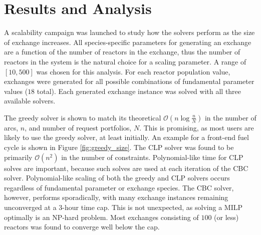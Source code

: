 \documentclass{anstrans}
\begin{document}
\section{Results and Analysis}

A scalability campaign was launched to study how the solvers perform as the size
of exchange increases. All species-specific parameters for generating an
exchange are a function of the number of reactors in the exchange, thus the
number of reactors in the system is the natural choice for a scaling
parameter. A range of $[10, 500]$ was chosen for this analysis. For each reactor
population value, exchanges were generated for all possible combinations of
fundamental parameter values ($18$ total). Each generated exchange instance was
solved with all three available solvers. 

The greedy solver is shown to match its theoretical
$\mathcal{O}(n\log{}\frac{n}{N})$ in the number of arcs, $n$, and number of
request portfolios, $N$. This is promising, as most users are likely to use the
greedy solver, at least initially. An example for a front-end fuel cycle is
shown in Figure \ref{fig:greedy_size}. The CLP solver was found to be primarily
$\mathcal{O}(n^2)$ in the number of constraints. Polynomial-like time for CLP
solves are important, because such solves are used at each iteration of the CBC
solver. Polynomial-like scaling of both the greedy and CLP solvers occurs
regardless of fundamental parameter or exchange species. The CBC solver,
however, performs sporadically, with many exchange instances remaining
unconverged at a $3$-hour time cap. This is not unexpected, as solving a MILP
optimally is an NP-hard problem. Most exchanges consisting of $100$ (or less)
reactors was found to converge well below the cap.
\end{document}

